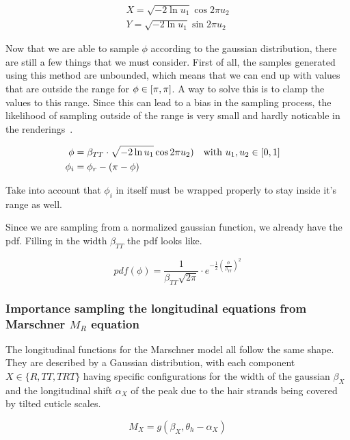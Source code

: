 \documentclass[12pt,a4paper,twoside]{article}
\begin{document}
\begin{eqnarray}
X = \sqrt{-2 \ln u_1} \cos 2\pi u_2 \\
Y = \sqrt{-2 \ln u_1} \sin 2\pi u_2 
\end{eqnarray}

Now that we are able to sample $\phi$ according to the gaussian distribution, there are still a few things that we must consider. First of all, the samples generated using this method are unbounded, which means that we can end up with values that are outside the range for $\phi \in [\-\pi, \pi]$. A way to solve this is to clamp the values to this range. Since this can lead to a bias in the sampling process, the likelihood of sampling outside of the range is very small and hardly noticable in the renderings~\cite{pixarmemo}.

\begin{align}
\phi & = \beta_{TT} \cdot \sqrt{-2 \ln u_1} \cos 2\pi u_2) & \textnormal{with $u_1, u_2 \in [0, 1]$}  \\
\phi_i & = \phi_r - (\pi - \phi) &&
\end{align}


Take into account that $\phi_i$ in itself must be wrapped properly to stay inside it's range as well.

Since we are sampling from a normalized gaussian function, we already have the pdf. Filling in the width $\beta_{TT}$ the pdf looks like.

\begin{equation}
pdf(\phi) = \frac{1}{\beta_{TT} \sqrt{2\pi}} \cdot e^{-\frac{1}{2}(\frac{\phi}{\beta_{TT}})^2}
\end{equation}

\subsubsection*{Importance sampling the longitudinal equations from Marschner $M_R$ equation}

The longitudinal functions for the Marschner model all follow the same shape. They are described by a Gaussian distribution, with each component $X \in \{R, TT, TRT\}$ having specific configurations for the width of the gaussian $\beta_X$ and the longitudinal shift $\alpha_X$ of the peak due to the hair strands being covered by tilted cuticle scales.

\begin{equation}
M_X = g(\beta_X, \theta_h - \alpha_X)
\end{equation}
\end{document}
